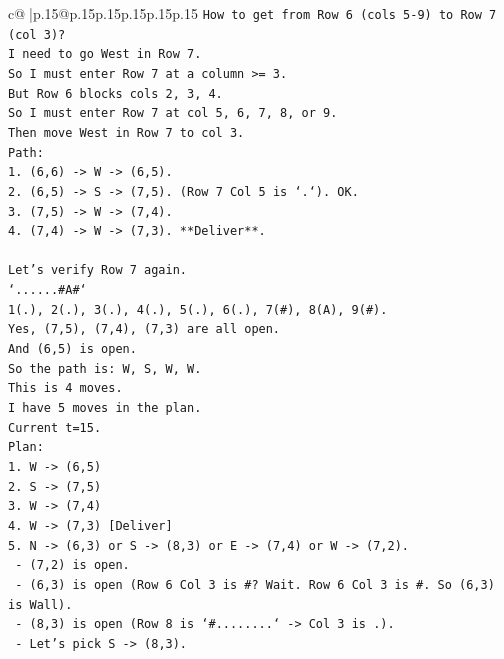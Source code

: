 \documentclass{article}
\begin{document}
{\begin{supertabular}{c@{$\;$}|p{.15\linewidth}@{}p{.15\linewidth}p{.15\linewidth}p{.15\linewidth}p{.15\linewidth}p{.15\linewidth}}
{{{\texttt{How to get from Row 6 (cols 5{-}9) to Row 7 (col 3)?} \\
\texttt{I need to go West in Row 7.} \\
\texttt{So I must enter Row 7 at a column >= 3.} \\
\texttt{But Row 6 blocks cols 2, 3, 4.} \\
\texttt{So I must enter Row 7 at col 5, 6, 7, 8, or 9.} \\
\texttt{Then move West in Row 7 to col 3.} \\
\texttt{Path:} \\
\texttt{1. (6,6) {-}> W {-}> (6,5).} \\
\texttt{2. (6,5) {-}> S {-}> (7,5). (Row 7 Col 5 is `.`). OK.} \\
\texttt{3. (7,5) {-}> W {-}> (7,4).} \\
\texttt{4. (7,4) {-}> W {-}> (7,3). **Deliver**.} \\
\\ 
\texttt{Let's verify Row 7 again.} \\
\texttt{`......\#A\#`} \\
\texttt{1(.), 2(.), 3(.), 4(.), 5(.), 6(.), 7(\#), 8(A), 9(\#).} \\
\texttt{Yes, (7,5), (7,4), (7,3) are all open.} \\
\texttt{And (6,5) is open.} \\
\texttt{So the path is: W, S, W, W.} \\
\texttt{This is 4 moves.} \\
\texttt{I have 5 moves in the plan.} \\
\texttt{Current t=15.} \\
\texttt{Plan:} \\
\texttt{1. W {-}> (6,5)} \\
\texttt{2. S {-}> (7,5)} \\
\texttt{3. W {-}> (7,4)} \\
\texttt{4. W {-}> (7,3) {[}Deliver{]}} \\
\texttt{5. N {-}> (6,3) or S {-}> (8,3) or E {-}> (7,4) or W {-}> (7,2).} \\
\texttt{   {-} (7,2) is open.} \\
\texttt{   {-} (6,3) is open (Row 6 Col 3 is \#? Wait. Row 6 Col 3 is \#. So (6,3) is Wall).} \\
\texttt{   {-} (8,3) is open (Row 8 is `\#........` {-}> Col 3 is .).} \\
\texttt{   {-} Let's pick S {-}> (8,3).} \\
\\ 
}}}
\end{supertabular}}
\end{document}
